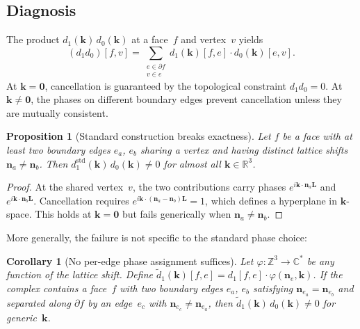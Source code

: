 \documentclass[preprint,12pt]{elsarticle}
\newtheorem{proposition}{Proposition}
\newtheorem{corollary}{Corollary}
\begin{document}
\subsection{Diagnosis}

The product $d_1(\mathbf{k})\,d_0(\mathbf{k})$ at a face~$f$ and vertex~$v$ yields
\begin{equation}\label{eq:product}
  (d_1 d_0)[f,v] = \sum_{\substack{e \in \partial f \\ v \in e}} d_1(\mathbf{k})[f,e] \cdot d_0(\mathbf{k})[e,v].
\end{equation}
At $\mathbf{k} = \mathbf{0}$, cancellation is guaranteed by the topological constraint $d_1 d_0 = 0$. At $\mathbf{k} \neq \mathbf{0}$, the phases on different boundary edges prevent cancellation unless they are mutually consistent.

\begin{proposition}[Standard construction breaks exactness]\label{prop:break}
Let $f$ be a face with at least two boundary edges $e_a$, $e_b$ sharing a vertex and having distinct lattice shifts $\mathbf{n}_a \neq \mathbf{n}_b$. Then $d_1^{\mathrm{std}}(\mathbf{k})\,d_0(\mathbf{k}) \neq 0$ for almost all $\mathbf{k} \in \mathbb{R}^3$.
\end{proposition}

\begin{proof}
At the shared vertex~$v$, the two contributions carry phases $e^{i\mathbf{k}\cdot\mathbf{n}_a\mathbf{L}}$ and $e^{i\mathbf{k}\cdot\mathbf{n}_b\mathbf{L}}$. Cancellation requires $e^{i\mathbf{k}\cdot(\mathbf{n}_a - \mathbf{n}_b)\mathbf{L}} = 1$, which defines a hyperplane in $\mathbf{k}$-space. This holds at $\mathbf{k} = \mathbf{0}$ but fails generically when $\mathbf{n}_a \neq \mathbf{n}_b$.
\end{proof}

More generally, the failure is not specific to the standard phase choice:

\begin{corollary}[No per-edge phase assignment suffices]\label{cor:noedge}
Let $\varphi\colon\mathbb{Z}^3\to\mathbb{C}^*$ be any function of the lattice shift. Define $\tilde{d}_1(\mathbf{k})[f,e] = d_1[f,e]\cdot\varphi(\mathbf{n}_e,\mathbf{k})$. If the complex contains a face~$f$ with two boundary edges $e_a$, $e_b$ satisfying $\mathbf{n}_{e_a} = \mathbf{n}_{e_b}$ and separated along $\partial f$ by an edge~$e_c$ with $\mathbf{n}_{e_c} \neq \mathbf{n}_{e_a}$, then $\tilde{d}_1(\mathbf{k})\,d_0(\mathbf{k}) \neq 0$ for generic~$\mathbf{k}$.
\end{corollary}
\end{document}

